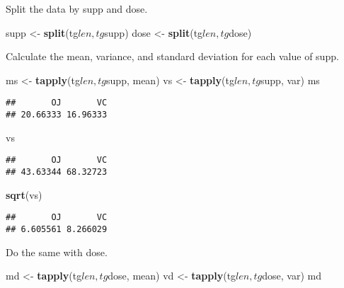\documentclass[]{article}
\newenvironment{Shaded}{\begin{snugshade}}{\end{snugshade}}
\newcommand{\KeywordTok}[1]{\textcolor[rgb]{0.13,0.29,0.53}{\textbf{{#1}}}}
\newcommand{\StringTok}[1]{\textcolor[rgb]{0.31,0.60,0.02}{{#1}}}
\newcommand{\NormalTok}[1]{{#1}}
\begin{document}
Split the data by supp and dose.

\begin{Shaded}
\begin{Highlighting}[]
    \NormalTok{supp <-}\StringTok{ }\KeywordTok{split}\NormalTok{(tg$len, tg$supp)}
    \NormalTok{dose <-}\StringTok{ }\KeywordTok{split}\NormalTok{(tg$len, tg$dose)}
\end{Highlighting}
\end{Shaded}

Calculate the mean, variance, and standard deviation for each value of
supp.

\begin{Shaded}
\begin{Highlighting}[]
    \NormalTok{ms <-}\StringTok{ }\KeywordTok{tapply}\NormalTok{(tg$len, tg$supp, mean)}
    \NormalTok{vs <-}\StringTok{ }\KeywordTok{tapply}\NormalTok{(tg$len, tg$supp, var)}
    \NormalTok{ms}
\end{Highlighting}
\end{Shaded}

\begin{verbatim}
##       OJ       VC 
## 20.66333 16.96333
\end{verbatim}

\begin{Shaded}
\begin{Highlighting}[]
    \NormalTok{vs}
\end{Highlighting}
\end{Shaded}

\begin{verbatim}
##       OJ       VC 
## 43.63344 68.32723
\end{verbatim}

\begin{Shaded}
\begin{Highlighting}[]
    \KeywordTok{sqrt}\NormalTok{(vs)}
\end{Highlighting}
\end{Shaded}

\begin{verbatim}
##       OJ       VC 
## 6.605561 8.266029
\end{verbatim}

Do the same with dose.

\begin{Shaded}
\begin{Highlighting}[]
    \NormalTok{md <-}\StringTok{ }\KeywordTok{tapply}\NormalTok{(tg$len, tg$dose, mean)}
    \NormalTok{vd <-}\StringTok{ }\KeywordTok{tapply}\NormalTok{(tg$len, tg$dose, var)}
    \NormalTok{md}
\end{Highlighting}
\end{Shaded}
\end{document}
